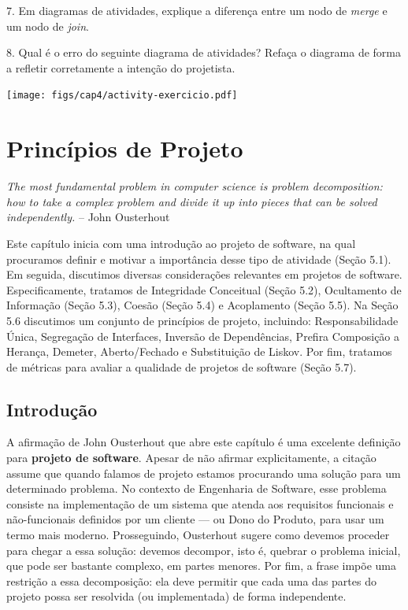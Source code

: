 \documentclass[
  11pt,
  twoside]{book}
\renewenvironment{quote}{\centering \vspace{1.5ex} \begin{tcolorbox}[colback=backcolor, width=4.9in]}{\end{tcolorbox}}
\begin{document}
7. Em diagramas de atividades, explique a diferença entre um nodo de
\emph{merge} e um nodo de \emph{join}.

8. Qual é o erro do seguinte diagrama de atividades? Refaça o diagrama
de forma a refletir corretamente a intenção do projetista.

\texttt{[image: figs/cap4/activity-exercicio.pdf]}

\hypertarget{princuxedpios-de-projeto}{%
\chapter{Princípios de Projeto}\label{princuxedpios-de-projeto}}

\begin{quote}
\emph{The most fundamental problem in computer science is problem
decomposition: how to take a complex problem and divide it up into
pieces that can be solved independently.} -- John Ousterhout
\end{quote}

 

Este capítulo inicia com uma introdução ao projeto de software, na qual
procuramos definir e motivar a importância desse tipo de atividade
(Seção 5.1). Em seguida, discutimos diversas considerações relevantes em
projetos de software. Especificamente, tratamos de Integridade
Conceitual (Seção 5.2), Ocultamento de Informação (Seção 5.3), Coesão
(Seção 5.4) e Acoplamento (Seção 5.5). Na Seção 5.6 discutimos um
conjunto de princípios de projeto, incluindo: Responsabilidade Única,
Segregação de Interfaces, Inversão de Dependências, Prefira Composição a
Herança, Demeter, Aberto/Fechado e Substituição de Liskov. Por fim,
tratamos de métricas para avaliar a qualidade de projetos de software
(Seção 5.7).

\hypertarget{introduuxe7uxe3o-2}{%
\section{Introdução}\label{introduuxe7uxe3o-2}}

 A afirmação de John Ousterhout que abre este
capítulo é uma excelente definição para \textbf{projeto de software}.
Apesar de não afirmar explicitamente, a citação assume que quando
falamos de projeto estamos procurando uma solução para um determinado
problema. No contexto de Engenharia de Software, esse problema consiste
na implementação de um sistema que atenda aos requisitos funcionais e
não-funcionais definidos por um cliente --- ou Dono do Produto, para
usar um termo mais moderno. Prosseguindo, Ousterhout sugere como devemos
proceder para chegar a essa solução: devemos decompor, isto é, quebrar o
problema inicial, que pode ser bastante complexo, em partes menores. Por
fim, a frase impõe uma restrição a essa decomposição: ela deve permitir
que cada uma das partes do projeto possa ser resolvida (ou implementada)
de forma independente.
\end{document}
